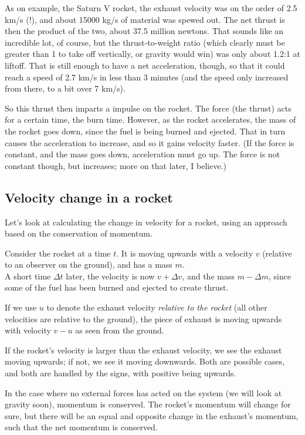 \documentclass[12pt,a4paper]{report}
\begin{document}
As on example, the Saturn V rocket, the exhaust velocity was on the order of 2.5 km/s (!), and about 15000 kg/s of material was spewed out. The net thrust is then the product of the two, about 37.5 million newtons. That sounds like an incredible lot, of course, but the thrust-to-weight ratio (which clearly must be greater than 1 to take off vertically, or gravity would win) was only about 1.2:1 at liftoff. That is still enough to have a net acceleration, though, so that it could reach a speed of 2.7 km/s in less than 3 minutes (and the speed only increased from there, to a bit over 7 km/s).

So this thrust then imparts a impulse on the rocket. The force (the thrust) acts for a certain time, the burn time. However, as the rocket accelerates, the mass of the rocket goes down, since the fuel is being burned and ejected. That in turn causes the acceleration to increase, and so it gains velocity faster. (If the force is constant, and the mass goes down, acceleration must go up. The force is not constant though, but increases; more on that later, I believe.)

\subsection{Velocity change in a rocket}

Let's look at calculating the change in velocity for a rocket, using an approach based on the conservation of momentum.

Consider the rocket at a time $t$. It is moving upwards with a velocity $v$ (relative to an observer on the ground), and has a mass $m$.\\
A short time $\Delta t$ later, the velocity is now $v + \Delta v$, and the mass $m - \Delta m$, since some of the fuel has been burned and ejected to create thrust.

If we use $u$ to denote the exhaust velocity \emph{relative to the rocket} (all other velocities are relative to the ground), the piece of exhaust is moving upwards with velocity $v - u$ as seen from the ground.

If the rocket's velocity is larger than the exhaust velocity, we see the exhaust moving upwards; if not, we see it moving downwards. Both are possible cases, and both are handled by the signs, with positive being upwards.

In the case where no external forces has acted on the system (we will look at gravity soon), momentum is conserved. The rocket's momentum will change for sure, but there will be an equal and opposite change in the exhaust's momentum, such that the net momentum is conserved.
\end{document}
